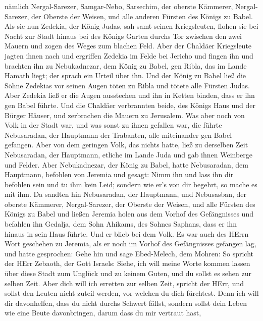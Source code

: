nämlich Nergal-Sarezer, Samgar-Nebo, Sarsechim, der oberste Kämmerer,
Nergal-Sarezer, der Oberste der Weisen, und alle anderen Fürsten des
Königs zu Babel.  Als sie nun Zedekia, der König Judas, sah
samt seinen Kriegsleuten, flohen sie bei Nacht zur Stadt hinaus bei des
Königs Garten durchs Tor zwischen den zwei Mauern und zogen des Weges
zum blachen Feld.  Aber der Chaldäer Kriegsleute jagten
ihnen nach und ergriffen Zedekia im Felde bei Jericho und fingen ihn und
brachten ihn zu Nebukadnezar, dem König zu Babel, gen Ribla, das im
Lande Hamath liegt; der sprach ein Urteil über ihn.  Und der
König zu Babel ließ die Söhne Zedekias vor seinen Augen töten zu Ribla
und tötete alle Fürsten Judas.  Aber Zedekia ließ er die
Augen ausstechen und ihn in Ketten binden, dass er ihn gen Babel führte.
 Und die Chaldäer verbrannten beide, des Königs Haus und der
Bürger Häuser, und zerbrachen die Mauern zu Jerusalem.  Was
aber noch von Volk in der Stadt war, und was sonst zu ihnen gefallen
war, die führte Nebusaradan, der Hauptmann der Trabanten, alle
miteinander gen Babel gefangen.  Aber von dem geringen
Volk, das nichts hatte, ließ zu derselben Zeit Nebusaradan, der
Hauptmann, etliche im Lande Juda und gab ihnen Weinberge und Felder.
 Aber Nebukadnezar, der König zu Babel, hatte Nebusaradan,
dem Hauptmann, befohlen von Jeremia und gesagt:  Nimm ihn
und lass ihn dir befohlen sein und tu ihm kein Leid; sondern wie er's
von dir begehrt, so mache es mit ihm.  Da sandten hin
Nebusaradan, der Hauptmann, und Nebusasban, der oberste Kämmerer,
Nergal-Sarezer, der Oberste der Weisen, und alle Fürsten des Königs zu
Babel  und ließen Jeremia holen aus dem Vorhof des
Gefängnisses und befahlen ihn Gedalja, dem Sohn Ahikams, des Sohnes
Saphans, dass er ihn hinaus in sein Haus führte. Und er blieb bei dem
Volk.  Es war auch des HErrn Wort geschehen zu Jeremia, als
er noch im Vorhof des Gefängnisses gefangen lag, und hatte gesprochen:
 Gehe hin und sage Ebed-Melech, dem Mohren: So spricht der
HErr Zebaoth, der Gott Israels: Siehe, ich will meine Worte kommen
lassen über diese Stadt zum Unglück und zu keinem Guten, und du sollst
es sehen zur selben Zeit.  Aber dich will ich erretten zur
selben Zeit, spricht der HErr, und sollst den Leuten nicht zuteil
werden, vor welchen du dich fürchtest.  Denn ich will dir
davonhelfen, dass du nicht durchs Schwert fällst, sondern sollst dein
Leben wie eine Beute davonbringen, darum dass du mir vertraut hast,
